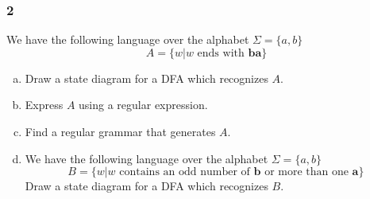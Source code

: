 \documentclass[../main.tex]{subfiles}
\begin{document}
\subsubsection*{2\hfill}
We have the following language over the alphabet $\Sigma = \{a, b\}$
\begin{equation*}
	A = \{w | w \text{ ends with } \mathbf{ba}\}
\end{equation*}
\begin{enumerate}[a)]
	\item Draw a state diagram for a DFA which recognizes $A$.
	\item Express $A$ using a regular expression.
	\item Find a regular grammar that generates $A$.
	\item We have the following language over the alphabet $\Sigma = \{a, b\}$
		\begin{equation*}
			B = \{w | w \text{ contains an odd number of } \mathbf{b} \text{ or more than one } \mathbf{a}\}
		\end{equation*}
		Draw a state diagram for a DFA which recognizes $B$.
\end{enumerate}

\solution
\end{document}
